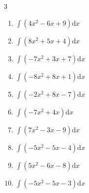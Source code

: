 \begin{multicols}{3}
\begin{enumerate}
\columnbreak %

  \item $\displaystyle \int \left( 4x^{2}-6x+9 \right) \mathrm{d}x$


  \item $\displaystyle \int \left( 8x^{2}+5x+4 \right) \mathrm{d}x$


  \item $\displaystyle \int \left( -7x^{2}+3x+7 \right) \mathrm{d}x$


  \item $\displaystyle \int \left( -8x^{2}+8x+1 \right) \mathrm{d}x$


  \item $\displaystyle \int \left( -2x^{2}+8x-7 \right) \mathrm{d}x$


  \item $\displaystyle \int \left( -7x^{2}+4x \right) \mathrm{d}x$


  \item $\displaystyle \int \left( 7x^{2}-3x-9 \right) \mathrm{d}x$


  \item $\displaystyle \int \left( -5x^{2}-5x-4 \right) \mathrm{d}x$


  \item $\displaystyle \int \left( 5x^{2}-6x-8 \right) \mathrm{d}x$


  \item $\displaystyle \int \left( -5x^{2}-5x-3 \right) \mathrm{d}x$



\end{enumerate}
\end{multicols}
